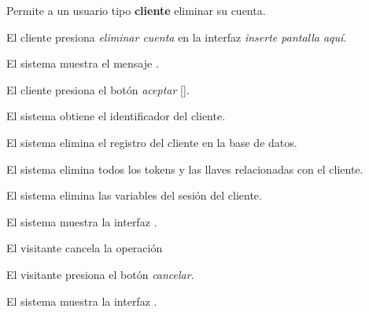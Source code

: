 %
%

{
  Permite a un usuario tipo \textbf{cliente} eliminar su cuenta.

  \begin{trayectoriaPrincipal}

    \item El cliente presiona \textit{eliminar cuenta} en la
      interfaz \textit{inserte pantalla aquí}.

    \item El sistema muestra el mensaje .

    \item El cliente presiona el botón \textit{aceptar}
      [].

    \item El sistema obtiene el identificador del cliente.

    \item El sistema elimina el registro del cliente en la base de datos.

    \item El sistema elimina todos los tokens y las llaves relacionadas con el
      cliente.

    \item El sistema elimina las variables del sesión del cliente.

    \item El sistema muestra la interfaz .
  \end{trayectoriaPrincipal}

  \begin{trayectoriaAlternativa}[ta:cancelar]
    {El visitante cancela la operación}

    \item El visitante presiona el botón \textit{cancelar}.

    \item El sistema muestra la interfaz
      .

  \end{trayectoriaAlternativa}
}
